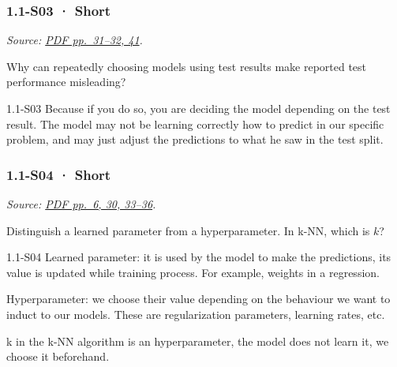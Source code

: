 \noindent\begin{minipage}{\linewidth}

\subsubsection{1.1-S03 · Short}\label{s03-short}

\emph{Source:
\href{../Lecture\%20Slides/1.1.\%20Fundamentals.pdf\#page=31}{PDF
pp.~31--32, 41}.}

Why can repeatedly choosing models using test results make reported test
performance misleading?

\begin{solution}[20mm]{1.1-S03}
Because if you do so, you are deciding the model depending on the test result. The model may not be learning correctly how to predict in our specific problem, and may just adjust the predictions to what he saw in the test split.
\end{solution}
\end{minipage}\par\medskip

\noindent\begin{minipage}{\linewidth}

\subsubsection{1.1-S04 · Short}\label{s04-short}

\emph{Source:
\href{../Lecture\%20Slides/1.1.\%20Fundamentals.pdf\#page=6}{PDF pp.~6,
30, 33--36}.}

Distinguish a learned parameter from a hyperparameter. In k-NN, which is
\(k\)?

\begin{solution}[20mm]{1.1-S04}
Learned parameter: it is used by the model to make the predictions, its value is updated while training process. For example, weights in a regression.

Hyperparameter: we choose their value depending on the behaviour we want to induct to our models. These are regularization parameters, learning rates, etc.

k in the k-NN algorithm is an hyperparameter, the model does not learn it, we choose it beforehand.
\end{solution}
\end{minipage}\par\medskip

